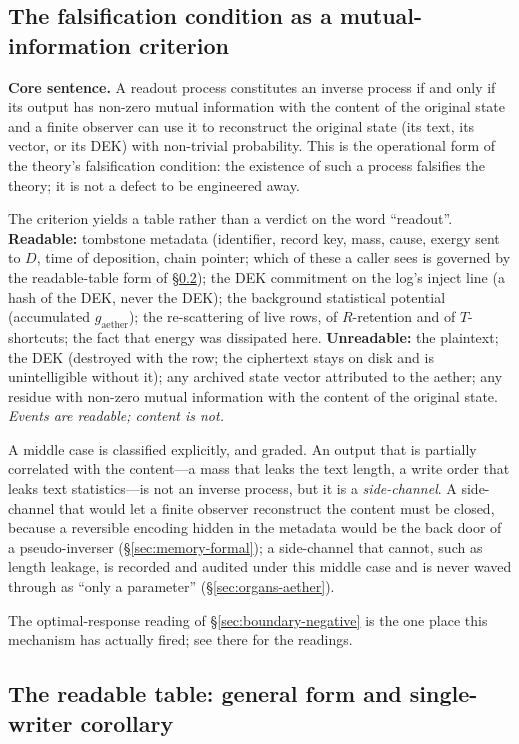 \documentclass[11pt,a4paper]{article}
\newcommand{\gaether}{g_{\mathrm{aether}}}
\begin{document}
\subsection{The falsification condition as a mutual-information criterion}
\label{sec:organs-criterion}

\textbf{Core sentence.} A readout process constitutes an inverse process if and only if its output has non-zero mutual information with the content of the original state and a finite observer can use it to reconstruct the original state (its text, its vector, or its DEK) with non-trivial probability. This is the operational form of the theory's falsification condition: the existence of such a process falsifies the theory; it is not a defect to be engineered away.

The criterion yields a table rather than a verdict on the word ``readout''. \textbf{Readable:} tombstone metadata (identifier, record key, mass, cause, exergy sent to $D$, time of deposition, chain pointer; which of these a caller sees is governed by the readable-table form of \S\ref{sec:organs-readable}); the DEK commitment on the log's inject line (a hash of the DEK, never the DEK); the background statistical potential (accumulated $\gaether$); the re-scattering of live rows, of $R$-retention and of $T$-shortcuts; the fact that energy was dissipated here. \textbf{Unreadable:} the plaintext; the DEK (destroyed with the row; the ciphertext stays on disk and is unintelligible without it); any archived state vector attributed to the aether; any residue with non-zero mutual information with the content of the original state. \emph{Events are readable; content is not.}

A middle case is classified explicitly, and graded. An output that is partially correlated with the content---a mass that leaks the text length, a write order that leaks text statistics---is not an inverse process, but it is a \emph{side-channel}. A side-channel that would let a finite observer reconstruct the content must be closed, because a reversible encoding hidden in the metadata would be the back door of a pseudo-inverser (\S\ref{sec:memory-formal}); a side-channel that cannot, such as length leakage, is recorded and audited under this middle case and is never waved through as ``only a parameter'' (\S\ref{sec:organs-aether}).

The optimal-response reading of \S\ref{sec:boundary-negative} is the one place this mechanism has actually fired; see there for the readings.

\subsection{The readable table: general form and single-writer corollary}
\label{sec:organs-readable}
\end{document}
